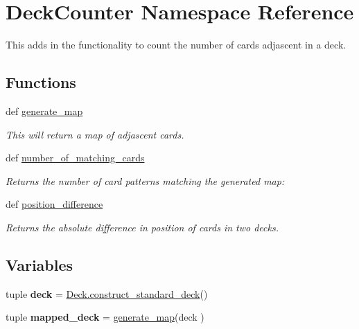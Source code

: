 \hypertarget{namespaceDeckCounter}{\section{Deck\-Counter Namespace Reference}
\label{namespaceDeckCounter}
}


This adds in the functionality to count the number of cards adjascent in a deck.  


\subsection*{Functions}
\begin{DoxyCompactItemize}
\item 
def \hyperlink{namespaceDeckCounter_a663ddc2c79f7719e19e7c3d29ba87b8b}{generate\-\_\-map}
\begin{DoxyCompactList}\small\item\em This will return a map of adjascent cards. \end{DoxyCompactList}\item 
\hypertarget{namespaceDeckCounter_a435a500cb37236219126db246e228de9}{def \hyperlink{namespaceDeckCounter_a435a500cb37236219126db246e228de9}{number\-\_\-of\-\_\-matching\-\_\-cards}}\label{namespaceDeckCounter_a435a500cb37236219126db246e228de9}

\begin{DoxyCompactList}\small\item\em Returns the number of card patterns matching the generated map\-: \end{DoxyCompactList}\item 
def \hyperlink{namespaceDeckCounter_aff09ebd7246dcad9e253438baf27829f}{position\-\_\-difference}
\begin{DoxyCompactList}\small\item\em Returns the absolute difference in position of cards in two decks. \end{DoxyCompactList}\end{DoxyCompactItemize}
\subsection*{Variables}
\begin{DoxyCompactItemize}
\item 
\hypertarget{namespaceDeckCounter_a9628086efbf8c6d513c4087c2993c611}{tuple {\bfseries deck} = \hyperlink{namespaceDeck_a340de333e50a1a85213e9fcb02e14a73}{Deck.\-construct\-\_\-standard\-\_\-deck}()}\label{namespaceDeckCounter_a9628086efbf8c6d513c4087c2993c611}

\item 
\hypertarget{namespaceDeckCounter_af7fe874d0b6a0b850ed90591664d1298}{tuple {\bfseries mapped\-\_\-deck} = \hyperlink{namespaceDeckCounter_a663ddc2c79f7719e19e7c3d29ba87b8b}{generate\-\_\-map}(deck )}\label{namespaceDeckCounter_af7fe874d0b6a0b850ed90591664d1298}

\end{DoxyCompactItemize}


